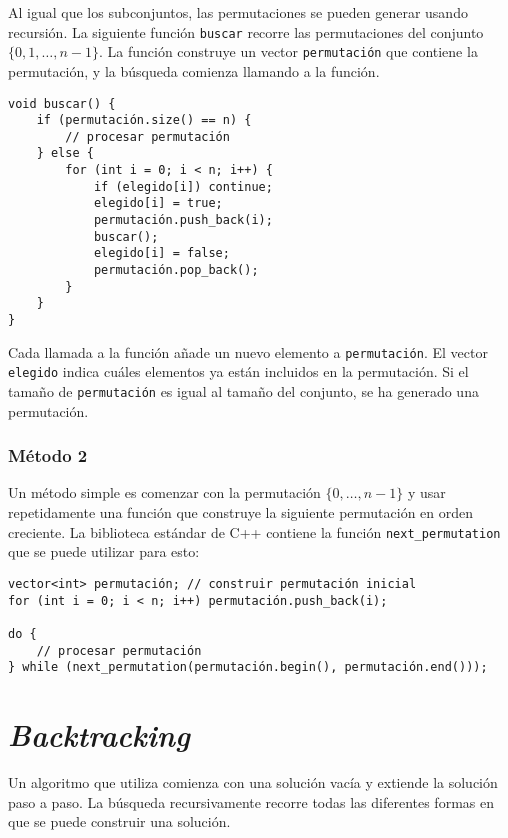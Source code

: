 Al igual que los subconjuntos, las permutaciones se pueden generar
usando recursión.
La siguiente función \texttt{buscar} recorre
las permutaciones del conjunto $\{0,1,\ldots,n-1\}$.
La función construye un vector \texttt{permutación}
que contiene la permutación,
y la búsqueda comienza llamando a la función.

\begin{lstlisting}
void buscar() {
    if (permutación.size() == n) {
        // procesar permutación
    } else {
        for (int i = 0; i < n; i++) {
            if (elegido[i]) continue;
            elegido[i] = true;
            permutación.push_back(i);
            buscar();
            elegido[i] = false;
            permutación.pop_back();
        }
    }
}
\end{lstlisting}

Cada llamada a la función añade un nuevo elemento a
\texttt{permutación}.
El vector \texttt{elegido} indica cuáles
elementos ya están incluidos en la permutación.
Si el tamaño de \texttt{permutación} es igual al tamaño del conjunto,
se ha generado una permutación.

\subsubsection{Método 2}


Un método simple es comenzar con la permutación
$\{0,\ldots,n-1\}$ y usar repetidamente
una función que construye la siguiente permutación
en orden creciente.
La biblioteca estándar de C++ contiene la función
\texttt{next\_permutation} que se puede utilizar para esto:

\begin{lstlisting}
vector<int> permutación; // construir permutación inicial
for (int i = 0; i < n; i++) permutación.push_back(i);

do {
    // procesar permutación
} while (next_permutation(permutación.begin(), permutación.end()));
\end{lstlisting}

\section{\textit{Backtracking}}


Un algoritmo que utiliza 
comienza con una solución vacía
y extiende la solución paso a paso.
La búsqueda recursivamente
recorre todas las diferentes formas en que
se puede construir una solución.

